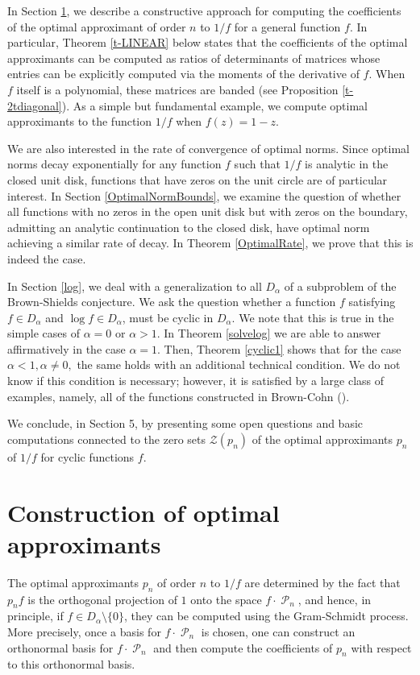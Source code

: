 \documentclass[11 pt,reqno]{amsart}
\theoremstyle{definition}
\theoremstyle{remark}
\numberwithin{equation}{section} \numberwithin{figure}{section}
\DeclareMathOperator{\Pol}{{\mathcal P}}
\begin{document}
In Section \ref{s-GRADIENT}, we describe a constructive approach for
computing the coefficients of the optimal approximant of order $n$
to $1/f$ for a general function $f$. In particular, Theorem
\ref{t-LINEAR} below states that the coefficients of the optimal
approximants can be computed as ratios of determinants of matrices
whose entries can be explicitly computed via the moments of the
derivative of $f$.  When $f$ itself is a polynomial, these matrices
are banded (see Proposition \ref{t-2tdiagonal}).  As a simple
but fundamental example, we compute optimal approximants to the
function $1/f$ when $f(z)=1-z$.

We are also interested in the rate of convergence of optimal norms.
Since optimal norms decay exponentially for any function $f$ such that $1/f$ is
analytic in the closed unit disk, functions that have zeros on the unit circle
are of particular interest.
In Section \ref{OptimalNormBounds}, we examine the question of whether all functions
with no zeros in the open unit disk but with zeros on the boundary, admitting an
analytic continuation to the closed disk, have optimal norm
achieving a similar rate of decay.
In Theorem \ref{OptimalRate}, we prove that this is indeed the case.


In Section \ref{log}, we deal with a generalization to all $D_\alpha$ of a
subproblem of the Brown-Shields conjecture. We ask the question whether a
function $f$ satisfying $f \in D_\alpha$ and $\log f \in D_\alpha$, must
be cyclic in $D_\alpha$. We note that this is true in the simple cases
of $\alpha = 0$ or $\alpha>1$. In Theorem \ref{solvelog} we are able to
answer affirmatively in the case
$\alpha=1$. Then, Theorem \ref{cyclic1} shows that for the case
$\alpha < 1, \alpha \neq 0,$ the same holds with an additional
technical condition. We do not know if this condition is necessary;
however, it is satisfied by a large class of examples, namely, all of
the functions constructed in Brown-Cohn (\cite{BC85}).

We conclude, in Section 5, by presenting some open questions and basic
computations connected to the zero sets $\mathcal{Z}(p_n)$ of the optimal
approximants $p_n$ of $1/f$ for cyclic functions $f$.



\section{Construction of optimal approximants}\label{s-GRADIENT}

The optimal approximants $p_n$ of order $n$ to $1/f$ are determined by the fact that
$p_nf$ is the orthogonal projection of $1$ onto the space $f\cdot\Pol_n$, and hence,
in principle, if $f\in D_{\alpha}\setminus\{0\}$, they can be computed using the
Gram-Schmidt process.  More precisely, once
a basis for $f\cdot\Pol_n$ is chosen, one can construct an orthonormal basis for
$f\cdot\Pol_{n}$ and then compute the coefficients of $p_n$ with respect to this
orthonormal basis.
\end{document}

